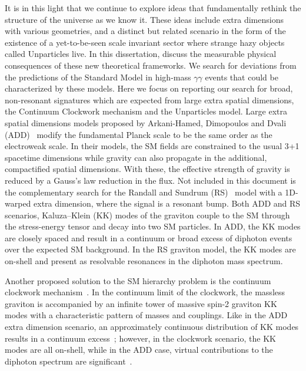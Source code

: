It is in this light that we continue to explore ideas that fundamentally rethink the structure of the universe as we know it. These ideas include extra dimensions with various geometries, and a distinct but related scenario in the form of the existence of a yet-to-be-seen scale invariant sector where strange hazy objects called Unparticles live. In this dissertation, discuss the measurable physical consequences of these new theoretical frameworks. We search for deviations from the predictions of the Standard Model in high-mass $\gamma\gamma$ events that could be characterized by these models. Here we focus on reporting our search for broad, non-resonant signatures which are expected from large extra spatial dimensions, the Continuum Clockwork mechanism and the Unparticles model. Large extra spatial dimensions models proposed by Arkani-Hamed, Dimopoulos and Dvali (ADD)~\cite{ArkaniHamed:1998rs, Antoniadis:1998ig, ArkaniHamed:1998nn} modify the fundamental Planck scale to be the same order as the electroweak scale. In their models, the SM fields are constrained to the usual 3+1 spacetime dimensions while gravity can also propagate in the \nED additional, compactified spatial dimensions. With these, the effective strength of gravity is reduced by a Gauss's law reduction in the flux. Not included in this document is the complementary search for the Randall and Sundrum (RS)~\cite{Randall:1999ee,Randall:1999vf} model with a 1D-warped extra dimension, where the signal is a resonant bump. Both ADD and RS scenarios, Kaluza--Klein (KK) modes of the graviton couple to the SM through the stress-energy tensor and decay into two SM particles. In ADD, the KK modes are closely spaced and result in a continuum or broad excess of diphoton events over the expected SM background. In the RS graviton model, the KK modes are on-shell and present as resolvable resonances in the diphoton mass spectrum.

Another proposed solution to the SM hierarchy problem is the continuum clockwork mech\-anism~\cite{Giudice:2016yja}.
In the continuum limit of the clockwork, the massless graviton is accompanied by an infinite tower of massive spin-2 graviton KK modes with a characteristic pattern of masses and couplings.
Like in the ADD extra dimension scenario, an approximately continuous distribution of KK modes results in a continuum excess~\cite{5LittleStringTheoryAtATeV, Giudiceetal}; however, in the clockwork scenario, the KK modes are all on-shell, while in the ADD case, virtual contributions to the diphoton spectrum are significant~\cite{Giudice:2003tu,Giudice:2004mg,Franceschini:2011wr}.

